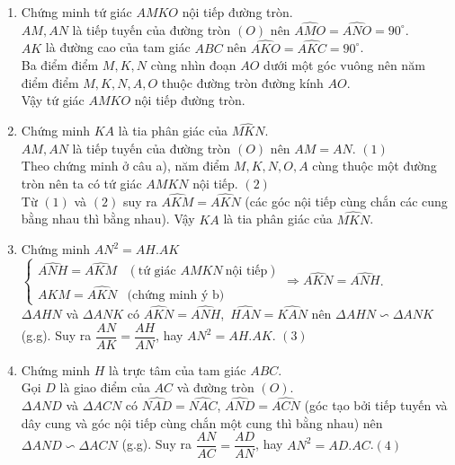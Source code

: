 \begin{bt}
{\begin{center}
\end{center}
\begin{enumerate}
\item Chứng minh tứ giác $AMKO$ nội tiếp đường tròn.\\
$AM,AN$ là tiếp tuyến của đường tròn $(O)$ nên $\widehat{AMO}=\widehat{ANO}=90^\circ$.\\
$AK$ là đường cao của tam giác $ABC$ nên $\widehat{AKO}=\widehat{AKC}=90^\circ$.\\
Ba điểm điểm $M,K,N$ cùng nhìn đoạn $AO$ dưới một góc vuông nên năm điểm điểm  $M,K,N,A,O$  thuộc đường tròn đường kính $AO$.\\
Vậy tứ giác $AMKO$ nội tiếp đường tròn.
\item Chứng minh $KA$ là tia phân giác của $\widehat{MKN}$.\\
$AM,AN$ là tiếp tuyến của đường tròn $(O)$ nên $AM=AN$. \hfill $(1)$\\
Theo chứng minh ở câu a), năm điểm $M,K,N,O,A$ cùng thuộc một đường tròn nên ta có tứ giác $AMKN$ nội tiếp. \hfill $(2)$\\
Từ $(1)$ và $(2)$ suy ra $\widehat{AKM}=\widehat{AKN}$ (các góc nội tiếp cùng chắn các cung bằng nhau thì bằng nhau). Vậy $KA$ là tia phân giác của $\widehat{MKN}$.
\item Chứng minh $AN^2=AH.AK$\\
$
\begin{cases}
\widehat{ANH}=\widehat{AKM} &(\text{tứ giác }AMKN   \ \text{nội tiếp})\\
\widehat{AKM}=\widehat{AKN}&\text{(chứng minh ý b)}
\end{cases}
\Rightarrow \widehat{AKN}=\widehat{ANH}$.\\
$\Delta AHN$ và $\Delta ANK$ có $\widehat{AKN}=\widehat{ANH}$,\  $\widehat{HAN}=\widehat{KAN}$ nên $\Delta AHN \backsim\Delta ANK$ (g.g). Suy ra $\dfrac{AN}{AK}=\dfrac{AH}{AN}$, hay $AN^2=AH.AK$. \hfill $(3)$
\item Chứng minh $H$ là trực tâm của tam giác $ABC$.\\
Gọi $D$ là giao điểm của $AC$ và đường tròn $(O)$.\\
$\Delta AND$ và $\Delta ACN$ có $\widehat{NAD}=\widehat{NAC}$, $\widehat{AND}=\widehat{ACN}$ (góc tạo bởi tiếp tuyến và dây cung  và góc nội tiếp cùng chắn một cung thì bằng nhau) nên $\Delta AND \backsim\Delta ACN$ (g.g). Suy ra $\dfrac{AN}{AC}=\dfrac{AD}{AN}$, hay $AN^2=AD.AC$.\hfill $(4)$\\

\end{enumerate}}
\end{bt}
